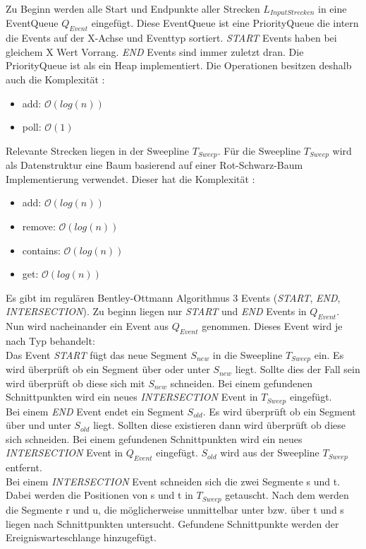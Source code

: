 \documentclass[conference]{IEEEtran}
\begin{document}
	Zu Beginn werden alle Start und Endpunkte aller Strecken $L_{InputStrecken}$ in eine EventQueue $Q_{Event}$ eingefügt. Diese EventQueue ist eine PriorityQueue die intern die Events auf der X-Achse und Eventtyp sortiert. \textit{START} Events haben bei gleichem X Wert Vorrang. \textit{END} Events sind immer zuletzt dran. Die PriorityQueue ist als ein Heap implementiert. Die Operationen besitzen deshalb auch die Komplexität \cite{b2}:
	\begin{itemize}
		\item add: $\mathcal{O}(log(n))$
		\item poll: $\mathcal{O}(1)$
	\end{itemize}
	Relevante Strecken liegen in der Sweepline $T_{Sweep}$.
	Für die Sweepline $T_{Sweep}$ wird als Datenstruktur eine Baum basierend auf einer Rot-Schwarz-Baum Implementierung verwendet. Dieser hat die Komplexität \cite{b1}:
	\begin{itemize}
		\item add: $\mathcal{O}(log(n))$
		\item remove: $\mathcal{O}(log(n))$
		\item contains: $\mathcal{O}(log(n))$
		\item get: $\mathcal{O}(log(n))$
	\end{itemize}
	Es gibt im regulären Bentley-Ottmann Algorithmus 3 Events (\textit{START}, \textit{END}, \textit{INTERSECTION}).
	Zu beginn liegen nur \textit{START} und \textit{END} Events in $Q_{Event}$.\\
	Nun wird nacheinander ein Event aus $Q_{Event}$ genommen. Dieses Event wird je nach Typ behandelt:\\
	Das Event \textit{START} fügt das neue Segment $S_{new}$ in die Sweepline $T_{Sweep}$ ein.
	Es wird überprüft ob ein Segment über oder unter $S_{new}$ liegt. Sollte dies der Fall sein wird überprüft ob diese sich mit $S_{new}$ schneiden. Bei einem gefundenen Schnittpunkten wird ein neues \textit{INTERSECTION} Event in $T_{Sweep}$ eingefügt.\\
	Bei einem \textit{END} Event endet ein Segment $S_{old}$. Es wird überprüft ob ein Segment über und unter $S_{old}$ liegt. Sollten diese existieren dann wird überprüft ob diese sich schneiden. Bei einem gefundenen Schnittpunkten wird ein neues \textit{INTERSECTION} Event in $Q_{Event}$ eingefügt. $S_{old}$ wird aus der Sweepline $T_{Sweep}$ entfernt.\\
	Bei einem \textit{INTERSECTION} Event schneiden sich die zwei Segmente s und t. Dabei werden die Positionen von s und t in $T_{Sweep}$ getauscht. Nach dem werden die Segmente r und u, die möglicherweise unmittelbar unter bzw. über t und s liegen nach Schnittpunkten untersucht. Gefundene Schnittpunkte werden der Ereigniswarteschlange hinzugefügt.
\end{document}
